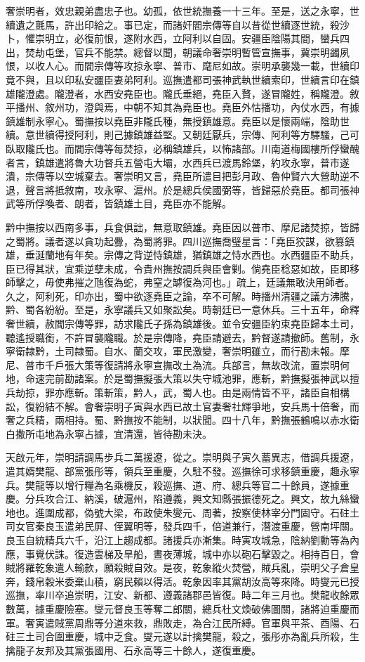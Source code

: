 \begin{pinyinscope}
奢崇明者，效忠親弟盡忠子也。幼孤，依世統撫養一十三年。至是，送之永寧，世續遺之氈馬，許出印給之。事已定，而諸奸閻宗傳等自以昔從世續逐世統，殺沙卜，懼崇明立，必復前恨，遂附水西，立阿利以自固。安疆臣陰陽其間，蠻兵四出，焚劫屯堡，官兵不能禁。總督以聞，朝議命奢崇明暫管宣撫事，冀崇明蠲夙恨，以收人心。而閻宗傳等攻掠永寧、普市、麾尼如故。崇明承襲幾一載，世續印竟不與，且以印私安疆臣妻弟阿利。巡撫遣都司張神武執世續索印，世續言印在鎮雄隴澄處。隴澄者，水西安堯臣也。隴氏垂絕，堯臣入贅，遂冒隴姓，稱隴澄。敘平播州、敘州功，澄與焉，中朝不知其為堯臣也。堯臣外怙播功，內仗水西，有據鎮雄制永寧心。蜀撫按以堯臣非隴氏種，無授鎮雄意。堯臣以是懷兩端，陰助世續。意世續得授阿利，則己據鎮雄益堅。又朝廷厭兵，宗傳、阿利等方驛騷，己可臥取隴氏也。而閻宗傳等每焚掠，必稱鎮雄兵，以怖諸部。川南道梅國樓所俘蠻醜者言，鎮雄遣將魯大功督兵五營屯大壩，水西兵已渡馬鈴堡，約攻永寧，普市遂潰，宗傳等以空城棄去。奢崇明又言，堯臣所遣目把彭月政、魯仲賢六大營助逆不退，聲言將抵敘南，攻永寧、滬州。於是總兵侯國弼等，皆歸惡於堯臣。都司張神武等所俘喚者、朗者，皆鎮雄土目，堯臣亦不能解。

黔中撫按以西南多事，兵食俱詘，無意取鎮雄。堯臣因以普市、摩尼諸焚掠，皆歸之蜀將。議者遂以貪功起釁，為蜀將罪。四川巡撫喬璧星言：「堯臣狡謀，欲篡鎮雄，垂涎蘭地有年矣。宗傳之背逆恃鎮雄，猶鎮雄之恃水西也。水西疆臣不助兵，臣已得其狀，宜乘逆孽未成，令貴州撫按調兵與臣會剿。倘堯臣稔惡如故，臣即移師擊之，毋使弗摧之虺復為蛇，弗窒之罅復為河也。」疏上，廷議無敢決用師者。久之，阿利死，印亦出，蜀中欲逐堯臣之論，卒不可解。時播州清疆之議方沸騰，黔、蜀各紛紛。至是，永寧議兵又如聚訟矣。時朝廷已一意休兵。三十五年，命釋奢世續，赦閻宗傳等罪，訪求隴氏子孫為鎮雄後。並令安疆臣約束堯臣歸本土司，聽遙授職銜，不許冒襲隴職。於是宗傳降，堯臣請避去，黔督遂請撤師。舊制，永寧衛隸黔，土司隸蜀。自水、蘭交攻，軍民激變，奢崇明雖立，而行勘未報。摩尼、普市千戶張大策等復請將永寧宣撫改土為流。兵部言，無故改流，置崇明何地，命速完前勘諸案。於是蜀撫擬張大策以失守城池罪，應斬，黔撫擬張神武以擅兵劫掠，罪亦應斬。策斬策，黔人，武，蜀人也。由是兩情皆不平，諸臣自相構訟，復紛結不解。會奢崇明子寅與水西已故土官妻奢社輝爭地，安兵馬十倍奢，而奢之兵精，兩相持。蜀、黔撫按不能制，以狀聞。四十八年，黔撫張鶴鳴以赤水衛白撒所屯地為永寧占據，宜清還，皆待勘未決。

天啟元年，崇明請調馬步兵二萬援遼，從之。崇明與子寅久蓄異志，借調兵援遼，遣其婿樊龍、部黨張彤等，領兵至重慶，久駐不發。巡撫徐可求移鎮重慶，趣永寧兵。樊龍等以增行糧為名乘機反，殺巡撫、道、府、總兵等官二十餘員，遂據重慶。分兵攻合江、納溪，破滬州，陷遵義，興文知縣張振德死之。興文，故九絲蠻地也。進圍成都，偽號大梁，布政使朱燮元、周著，按察使林宰分門固守。石砫土司女官秦良玉遣弟民屏、侄翼明等，發兵四千，倍道兼行，潛渡重慶，營南坪關。良玉自統精兵六千，沿江上趨成都。諸援兵亦漸集。時寅攻城急，陰納劉勳等為內應，事覺伏誅。復造雲梯及旱船，晝夜薄城，城中亦以砲石擊毀之。相持百日，會賊將羅乾象遣人輸款，願殺賊自效。是夜，乾象縱火焚營，賊兵亂，崇明父子倉皇奔，錢帛穀米委棄山積，窮民賴以得活。乾象因率其黨胡汝高等來降。時燮元已授巡撫，率川卒追崇明，江安、新都、遵義諸郡邑皆復。時二年三月也。樊龍收餘眾數萬，據重慶險塞。燮元督良玉等奪二郎關，總兵杜文煥破佛圖關，諸將迫重慶而軍。奢寅遣賊黨周鼎等分道來救，鼎敗走，為合江民所縛。官軍與平茶、酉陽、石砫三土司合圍重慶，城中乏食。燮元遂以計擒樊龍，殺之，張彤亦為亂兵所殺，生擒龍子友邦及其黨張國用、石永高等三十餘人，遂復重慶。


\end{pinyinscope}
